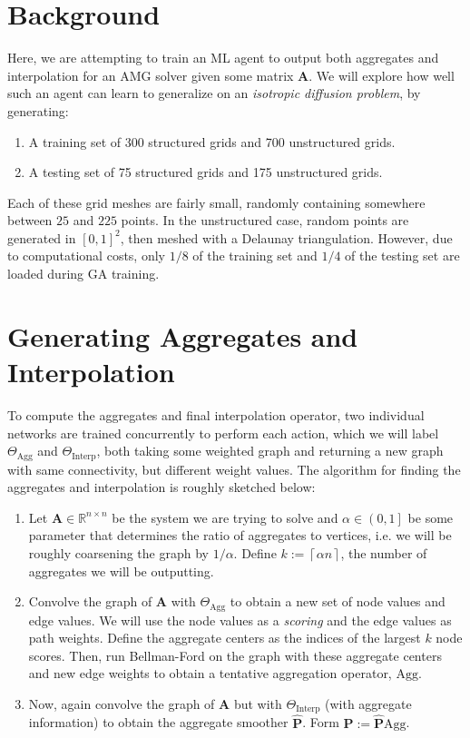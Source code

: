 \documentclass{article}
\newcommand{\mat}[1]{\bm{{#1}}}
\newcommand{\ceil}[1]{\left\lceil #1 \right\rceil}
\begin{document}
\section{Background}
Here, we are attempting to train an ML agent to output both aggregates and interpolation for an AMG solver given some matrix $\mat{A}$.  We will explore how well such an agent can learn to generalize on an \textit{isotropic diffusion problem}, by generating:
\begin{enumerate}
\item A training set of 300 structured grids and 700 unstructured grids.
\item A testing set of 75 structured grids and 175 unstructured grids.
\end{enumerate}
Each of these grid meshes are fairly small, randomly containing somewhere between $25$ and $225$ points.  In the unstructured case, random points are generated in $\left[0,1\right]^2$, then meshed with a Delaunay triangulation.  However, due to computational costs, only $1/8$ of the training set and $1/4$ of the testing set are loaded during GA training.

\section{Generating Aggregates and Interpolation}
To compute the aggregates and final interpolation operator, two individual networks are trained concurrently to perform each action, which we will label $\Theta_{\text{Agg}}$ and $\Theta_{\text{Interp}}$, both taking some weighted graph and returning a new graph with same connectivity, but different weight values.  The algorithm for finding the aggregates and interpolation is roughly sketched below:
\begin{enumerate}
\item Let $\mat{A} \in \mathbb{R}^{n \times n}$ be the system we are trying to solve and $\alpha \in \left(0, 1\right]$ be some parameter that determines the ratio of aggregates to vertices, i.e. we will be roughly coarsening the graph by $1/\alpha$.  Define $k := \ceil{\alpha n}$, the number of aggregates we will be outputting.
\item Convolve the graph of $\mat{A}$ with $\Theta_{\text{Agg}}$ to obtain a new set of node values and edge values.  We will use the node values as a \textit{scoring} and the edge values as path weights.  Define the aggregate centers as the indices of the largest $k$ node scores.  Then, run Bellman-Ford on the graph with these aggregate centers and new edge weights to obtain a tentative aggregation operator, $\text{Agg}$.
\item Now, again convolve the graph of $\mat{A}$ but with $\Theta_{\text{Interp}}$ (with aggregate information) to obtain the aggregate smoother $\mat{\hat{P}}$.  Form $\mat{P} := \mat{\hat{P}}\text{Agg}$.
\end{enumerate}
\end{document}

